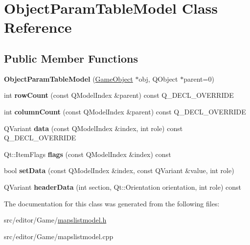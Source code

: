 \hypertarget{class_object_param_table_model}{\section{\-Object\-Param\-Table\-Model \-Class \-Reference}
\label{class_object_param_table_model}
}
\subsection*{\-Public \-Member \-Functions}
\begin{DoxyCompactItemize}
\item 
\hypertarget{class_object_param_table_model_a78d12e6b7666517b243f1acaf55a407f}{{\bfseries \-Object\-Param\-Table\-Model} (\hyperlink{class_game_object}{\-Game\-Object} $\ast$obj, \-Q\-Object $\ast$parent=0)}\label{class_object_param_table_model_a78d12e6b7666517b243f1acaf55a407f}

\item 
\hypertarget{class_object_param_table_model_a4be03e27217195b58f40a26ed200d103}{int {\bfseries row\-Count} (const \-Q\-Model\-Index \&parent) const \-Q\-\_\-\-D\-E\-C\-L\-\_\-\-O\-V\-E\-R\-R\-I\-D\-E}\label{class_object_param_table_model_a4be03e27217195b58f40a26ed200d103}

\item 
\hypertarget{class_object_param_table_model_af6c04299990e8c2b84247523b743d39e}{int {\bfseries column\-Count} (const \-Q\-Model\-Index \&parent) const \-Q\-\_\-\-D\-E\-C\-L\-\_\-\-O\-V\-E\-R\-R\-I\-D\-E}\label{class_object_param_table_model_af6c04299990e8c2b84247523b743d39e}

\item 
\hypertarget{class_object_param_table_model_a3da7a622e55f575af0b61dbf9d4e601a}{\-Q\-Variant {\bfseries data} (const \-Q\-Model\-Index \&index, int role) const \-Q\-\_\-\-D\-E\-C\-L\-\_\-\-O\-V\-E\-R\-R\-I\-D\-E}\label{class_object_param_table_model_a3da7a622e55f575af0b61dbf9d4e601a}

\item 
\hypertarget{class_object_param_table_model_ae1614bad47a855d54290311e5c800f27}{\-Qt\-::\-Item\-Flags {\bfseries flags} (const \-Q\-Model\-Index \&index) const }\label{class_object_param_table_model_ae1614bad47a855d54290311e5c800f27}

\item 
\hypertarget{class_object_param_table_model_a12d16a09a52c80b39d039109e108f277}{bool {\bfseries set\-Data} (const \-Q\-Model\-Index \&index, const \-Q\-Variant \&value, int role)}\label{class_object_param_table_model_a12d16a09a52c80b39d039109e108f277}

\item 
\hypertarget{class_object_param_table_model_af115ad0740731c101adfe33ac4ee9d4f}{\-Q\-Variant {\bfseries header\-Data} (int section, \-Qt\-::\-Orientation orientation, int role) const }\label{class_object_param_table_model_af115ad0740731c101adfe33ac4ee9d4f}

\end{DoxyCompactItemize}


\-The documentation for this class was generated from the following files\-:\begin{DoxyCompactItemize}
\item 
src/editor/\-Game/\hyperlink{mapslistmodel_8h}{mapslistmodel.\-h}\item 
src/editor/\-Game/mapslistmodel.\-cpp\end{DoxyCompactItemize}
